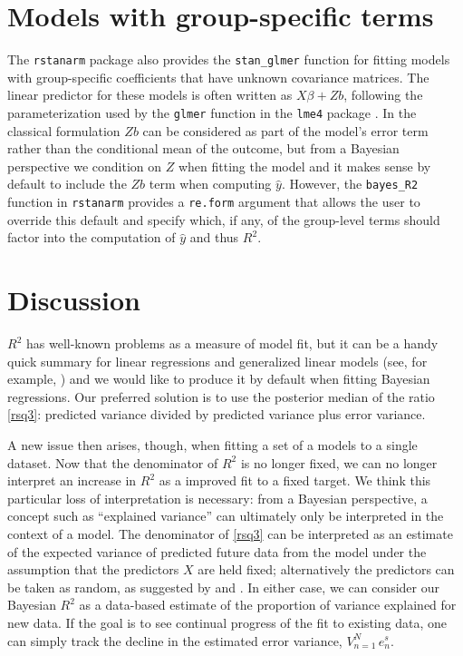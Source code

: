 \documentclass[11pt]{article}
\begin{document}
\section{Models with group-specific terms}
The {\tt rstanarm} package also provides the \verb#stan_glmer# function for
fitting models with group-specific coefficients that have unknown covariance
matrices. The linear predictor for these models is often written as
$X \beta + Zb$, following the parameterization used by the \verb#glmer#
function in the {\tt lme4} package \citep{lme4Rpackage}. In the classical
formulation $Zb$ can be considered as part of the model's error term rather than
the conditional mean of the outcome, but from a Bayesian perspective we
condition on $Z$ when fitting the model and it makes sense by default to include
the $Zb$ term when computing $\hat{y}$. However, the \verb#bayes_R2# function in
{\tt rstanarm} provides a {\tt re.form} argument that allows the user to
override this default and specify which, if any, of the group-level terms should
factor into the computation of $\hat{y}$ and thus $R^2$.

\section{Discussion}
$R^2$ has well-known problems as a measure of model fit, but it can be a handy
quick summary for linear regressions and generalized linear models (see, for
example, \cite{HuPaltaShao2006}) and we would like to produce it by default
when fitting Bayesian regressions.  Our preferred solution is to use the
posterior median of the ratio \eqref{rsq3}:  predicted variance divided by
predicted variance plus error variance.

A new issue then arises, though, when fitting a set of a models to a single
dataset.  Now that the denominator of $R^2$ is no longer fixed, we can no longer
interpret an increase in $R^2$ as a improved fit to a fixed target.  We think
this particular loss of interpretation is necessary:  from a Bayesian
perspective, a concept such as ``explained variance'' can ultimately only be
interpreted in the context of a model.  The denominator of \eqref{rsq3} can be
interpreted as an estimate of the expected variance of predicted future data
from the model under the assumption that the predictors $X$ are held fixed;
alternatively the predictors can be taken as random, as suggested by
\cite{Helland1987} and \cite{Tjur2009}.  In either case, we can consider our
Bayesian $R^2$ as a data-based estimate of the proportion of variance explained
for new data. If the goal is to see continual progress of the fit to existing
data, one can simply track the decline in the estimated error variance,
$V_{n=1}^N \,e_n^s$.
\end{document}
